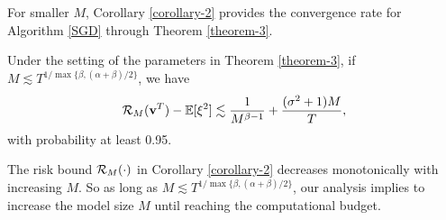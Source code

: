 


For smaller $M$, Corollary \ref{corollary-2} provides the convergence rate for Algorithm \ref{SGD} through Theorem \ref{theorem-3}. 
\begin{corollary}\label{corollary-2}
    Under the setting of the parameters in Theorem \ref{theorem-3}, if $M\lesssim T^{1/\max\{\beta,(\alpha+\beta)/2\}}$, we have
    \begin{align}
        \mathcal{R}_M(\mathbf{v}^T)-\mathbb{E}[\xi^2]\lesssim\frac{1}{M^{\beta-1}}+\frac{(\sigma^2+1)M}{T},\notag
    \end{align}
    with probability at least 0.95.
\end{corollary}
The risk bound $\mathcal{R}_M(\cdot)$ in Corollary \ref{corollary-2} decreases monotonically with increasing $M$.  So  as long as  $M\lesssim T^{1/\max\{\beta,(\alpha+\beta)/2\}}$, our analysis implies to increase the model size $M$ until reaching the  computational budget.



